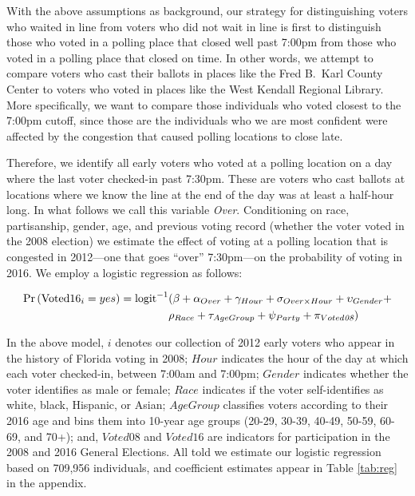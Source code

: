\documentclass[12pt,titlepage]{article}
\begin{document}
With the above assumptions as background, our strategy for
distinguishing voters who waited in line from voters who did not wait
in line is first to distinguish those who voted in a polling place
that closed well past 7:00pm from those who voted in a polling place
that closed on time.  In other words, we attempt to compare voters who
cast their ballots in places like the Fred B.\ Karl County Center to
voters who voted in places like the West Kendall Regional Library.
More specifically, we want to compare those individuals who voted
closest to the 7:00pm cutoff, since those are the individuals who we
are most confident were affected by the congestion that caused polling
locations to close late.
 
Therefore, we identify all early voters who voted at a polling
location on a day where the last voter checked-in past 7:30pm.  These
are voters who cast ballots at locations where we know the line at the
end of the day was at least a half-hour long.  In what follows we call
this variable \emph{Over}.  Conditioning on race, partisanship,
gender, age, and previous voting record (whether the voter voted in
the 2008 election) we estimate the effect of voting at a polling
location that is congested in 2012---one that goes ``over''
7:30pm---on the probability of voting in 2016.  We employ a logistic
regression as follows:

\begin{equation*}
  \begin{aligned}
    \textup{Pr}\left(\mathrm{Voted16}_{i} = yes\right) =  \textup{logit}^{-1}&(\beta + \alpha_{Over} + \gamma_{Hour} +
    \sigma_{Over \times Hour} + \upsilon_{Gender}  + \\& \rho_{Race} +
      \tau_{Age Group} + \psi_{Party} + \pi_{Voted\emph{08}})
  \end{aligned}
\end{equation*}

In the above model, $i$ denotes our collection of 2012 early voters
who appear in the history of Florida voting in 2008; $Hour$ indicates
the hour of the day at which each voter checked-in, between 7:00am and
7:00pm; $Gender$ indicates whether the voter identifies as male or
female; $Race$ indicates if the voter self-identifies as white, black,
Hispanic, or Asian; $AgeGroup$ classifies voters according to their
2016 age and bins them into 10-year age groups (20-29, 30-39, 40-49,
50-59, 60-69, and 70+); and, $Voted08$ and $Voted16$ are indicators
for participation in the 2008 and 2016 General Elections.  All told we
estimate our logistic regression based on 709,956 individuals, and
coefficient estimates appear in Table \ref{tab:reg} in the appendix.
\end{document}
